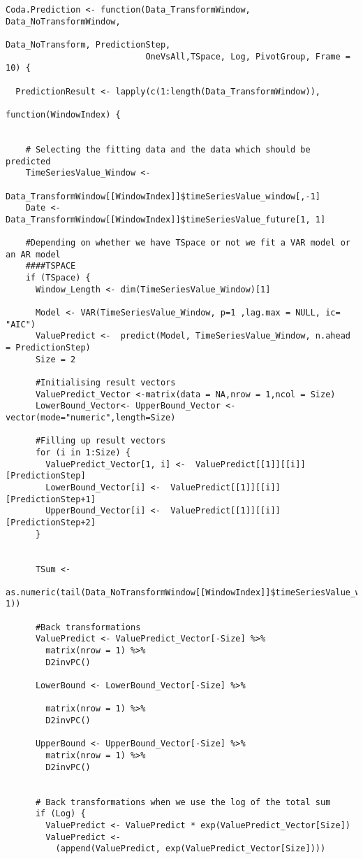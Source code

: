 \begin{verbatim}
Coda.Prediction <- function(Data_TransformWindow, Data_NoTransformWindow, 
														Data_NoTransform, PredictionStep,
                            OneVsAll,TSpace, Log, PivotGroup, Frame = 10) {
  
  PredictionResult <- lapply(c(1:length(Data_TransformWindow)), 
														 function(WindowIndex) {
    
    
    # Selecting the fitting data and the data which should be predicted 
    TimeSeriesValue_Window <- 
							Data_TransformWindow[[WindowIndex]]$timeSeriesValue_window[,-1]
    Date <- Data_TransformWindow[[WindowIndex]]$timeSeriesValue_future[1, 1]
    
    #Depending on whether we have TSpace or not we fit a VAR model or an AR model
    ####TSPACE
    if (TSpace) {
      Window_Length <- dim(TimeSeriesValue_Window)[1]
      
      Model <- VAR(TimeSeriesValue_Window, p=1 ,lag.max = NULL, ic= "AIC")
      ValuePredict <-  predict(Model, TimeSeriesValue_Window, n.ahead = PredictionStep)
      Size = 2
      
      #Initialising result vectors
      ValuePredict_Vector <-matrix(data = NA,nrow = 1,ncol = Size)
      LowerBound_Vector<- UpperBound_Vector <- vector(mode="numeric",length=Size)
      
      #Filling up result vectors
      for (i in 1:Size) {
        ValuePredict_Vector[1, i] <-  ValuePredict[[1]][[i]][PredictionStep]
        LowerBound_Vector[i] <-  ValuePredict[[1]][[i]][PredictionStep+1]
        UpperBound_Vector[i] <-  ValuePredict[[1]][[i]][PredictionStep+2]
      }
      
      
      TSum <- 
				as.numeric(tail(Data_NoTransformWindow[[WindowIndex]]$timeSeriesValue_window$tsum, 1))
      
      #Back transformations
      ValuePredict <- ValuePredict_Vector[-Size] %>%
        matrix(nrow = 1) %>%
        D2invPC()
      
      LowerBound <- LowerBound_Vector[-Size] %>%
        
        matrix(nrow = 1) %>%
        D2invPC()
      
      UpperBound <- UpperBound_Vector[-Size] %>%
        matrix(nrow = 1) %>%
        D2invPC()
      
      
      # Back transformations when we use the log of the total sum
      if (Log) {
        ValuePredict <- ValuePredict * exp(ValuePredict_Vector[Size])
        ValuePredict <-
          (append(ValuePredict, exp(ValuePredict_Vector[Size])))
        

\end{verbatim}
